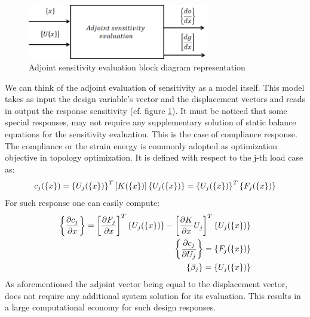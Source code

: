    \begin{figure}[ht]
   \centering
   \includegraphics[width=8cm]{images/Ch2/Adjoint}
   \caption{Adjoint sensitivity evaluation block diagram representation}
   \label{fig.2.6}
   \end{figure}
    We can think of the adjoint evaluation of sensitivity as a model itself. This model takes as input the design variable's vector and the displacement vectors and reads in output the response sensitivity (cf. figure \ref{fig.2.6}).
    It must be noticed that some special responses, may not require any supplementary solution of static balance equations for the sensitivity evaluation. This is the case of compliance response. The compliance or the strain energy is commonly adopted as optimization objective in topology optimization. It is defined with respect to the j-th load case as:
    \begin{equation}
    c_j(\left\lbrace{x}\right \rbrace)=\left\lbrace{ U_j (\ensuremath\left\lbrace{x}\right \rbrace)}\right \rbrace^T \left[{K(\left\lbrace{x}\right \rbrace)}\right]\left\lbrace{ U_j (\ensuremath\left\lbrace{x}\right \rbrace)}\right \rbrace=\left\lbrace{ U_j (\ensuremath\left\lbrace{x}\right \rbrace)}\right \rbrace^T\left\lbrace{ F_j (\ensuremath\left\lbrace{x}\right \rbrace)}\right \rbrace
    \end{equation}
   For such response one can easily compute:
   \begin{eqnarray}
   \left\lbrace{\frac{\partial c_j}{\partial x}}\right \rbrace=\left[{ \frac{\partial F_j}{\partial x}}\right]^T\left\lbrace{ U_j (\ensuremath\left\lbrace{x}\right \rbrace)}\right \rbrace-\left[{\frac{\partial K}{\partial x}U_j}\right]^T\left\lbrace{ U_j (\ensuremath\left\lbrace{x}\right \rbrace)}\right \rbrace\\
    \left\lbrace{\frac{\partial c_j}{\partial U_j}}\right \rbrace=\left\lbrace{ F_j (\ensuremath\left\lbrace{x}\right \rbrace)}\right \rbrace\\
    \left\lbrace{\beta_j}\right \rbrace=\left\lbrace{ U_j (\ensuremath\left\lbrace{x}\right \rbrace)}\right \rbrace
   \end{eqnarray}
   As aforementioned the adjoint vector being equal to the displacement vector, does not require any additional system solution for its evaluation. This results in a large computational economy for such design responses.
